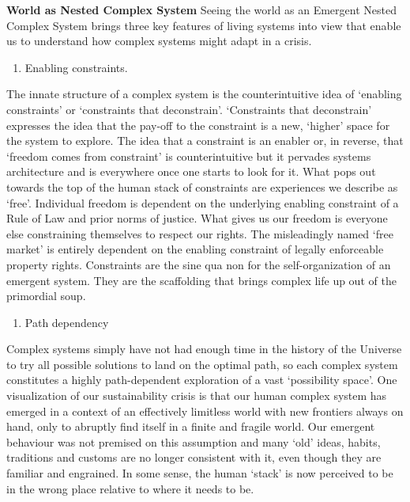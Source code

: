 \documentclass[
]{book}
\providecommand{\tightlist}{%
  \setlength{\itemsep}{0pt}\setlength{\parskip}{0pt}}
\begin{document}
\textbf{World as Nested Complex System}
Seeing the world as an Emergent Nested Complex System brings three key features of living systems
into view that enable us to understand how complex systems might adapt in a crisis.

\begin{enumerate}
\def\labelenumi{\arabic{enumi}.}
\tightlist
\item
  Enabling constraints.
\end{enumerate}

The innate structure of a complex system is the counterintuitive idea of `enabling constraints' or `constraints that deconstrain'.
`Constraints that deconstrain' expresses the idea that the pay-off to the constraint is a new, `higher' space for the system to explore. The idea that a constraint is an enabler or, in reverse, that `freedom comes from constraint' is counterintuitive but it pervades systems architecture and is everywhere once one starts to look for it. What pops out towards the top of the human stack of constraints are experiences we describe as `free'.
Individual freedom is dependent on the underlying enabling constraint of a Rule of
Law and prior norms of justice. What gives us our freedom is everyone else constraining themselves to respect our rights.
The misleadingly named `free market' is entirely dependent on the enabling constraint of
legally enforceable property rights.
Constraints are the sine qua non for the self-organization of an
emergent system. They are the scaffolding that brings complex life up out of the primordial soup.

\begin{enumerate}
\def\labelenumi{\arabic{enumi}.}
\setcounter{enumi}{1}
\tightlist
\item
  Path dependency
\end{enumerate}

Complex systems simply have not had enough time in the history of the Universe
to try all possible solutions to land on the optimal path, so each complex system constitutes a highly path-dependent exploration of a vast `possibility space'.
One visualization of our sustainability crisis is that our human complex system has emerged in a
context of an effectively limitless world with new frontiers always on hand, only to abruptly find
itself in a finite and fragile world. Our emergent behaviour was not premised on this assumption and
many `old' ideas, habits, traditions and customs are no longer consistent with it, even though they
are familiar and engrained. In some sense, the human `stack' is now perceived to be in the wrong
place relative to where it needs to be.
\end{document}
